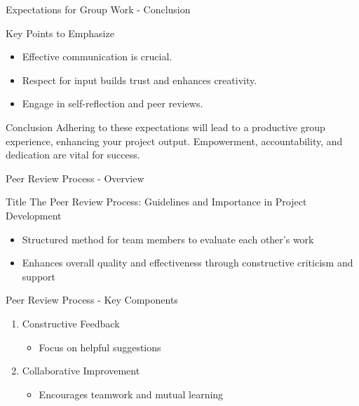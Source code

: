 \documentclass[aspectratio=169]{beamer}
\begin{document}
\begin{frame}[fragile]{Expectations for Group Work - Conclusion}
    \begin{block}{Key Points to Emphasize}
        \begin{itemize}
            \item Effective communication is crucial.
            \item Respect for input builds trust and enhances creativity.
            \item Engage in self-reflection and peer reviews.
        \end{itemize}
    \end{block}

    \begin{block}{Conclusion}
        Adhering to these expectations will lead to a productive group experience, enhancing your project output. Empowerment, accountability, and dedication are vital for success.
    \end{block}
\end{frame}

\begin{frame}[fragile]{Peer Review Process - Overview}
    \begin{block}{Title}
        The Peer Review Process: Guidelines and Importance in Project Development
    \end{block}
    \begin{itemize}
        \item Structured method for team members to evaluate each other's work
        \item Enhances overall quality and effectiveness through constructive criticism and support
    \end{itemize}
\end{frame}

\begin{frame}[fragile]{Peer Review Process - Key Components}
    \begin{enumerate}
        \item Constructive Feedback
        \begin{itemize}
            \item Focus on helpful suggestions
        \end{itemize}
        \item Collaborative Improvement
        \begin{itemize}
            \item Encourages teamwork and mutual learning
        \end{itemize}
    \end{enumerate}
\end{frame}
\end{document}
